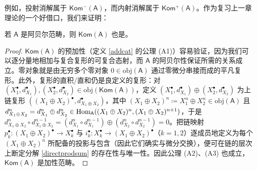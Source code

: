 
例如，投射消解属于 $\mathsf{Kom^-(A)}$，而内射消解属于 $\mathsf{Kom^+(A)}$。作为复习上一章理论的一个好借口，我们来证明：

\begin{Lem}\label{komabelian}
	若 $\mathsf{A}$ 是阿贝尔范畴，则 $\mathsf{Kom(A)}$ 也是。
\end{Lem}

\begin{proof}
	$\mathsf{Kom(A)}$ 的预加性（定义 \ref{addcat} 的公理 (A1)）容易验证，因为我们可以逐分量地相加与复合复形的可复合态射，而 $\mathsf{A}$ 的阿贝尔性保证所需的关系成立。零对象就是由无穷多个零对象 $0\in\text{obj}(\mathsf{A})$ 通过零微分串接而成的平凡复形。此外，复形的直积/直和仍是良定义的复形：对 $(X_1^\bullet, d_{X_1}^\bullet), (X_2^\bullet, d_{X_2}^\bullet)\in\text{obj}(\mathsf{Kom(A)})$，定义 $(X_1^\bullet, d_{X_1}^\bullet)\oplus(X_2^\bullet, d_{X_2}^\bullet)$ 为上链复形 $((X_1\oplus X_2)^\bullet, d_{X_1\oplus X_2}^\bullet)$，其中 $(X_1\oplus X_2)^n\coloneqq X_1^n\oplus X_2^n\in\text{obj}(\mathsf{A})$ 且 $d_{X_1\oplus X_2}^n=d_{X_1}^n\oplus d_{X_2}^n\in\text{Hom}_\mathsf{A}((X_1\oplus X_2)^n,\break(X_1\oplus X_2)^{n+1})$，于是 $d_{X_1\oplus X_2}^n\circ d_{X_1\oplus X_2}^{n-1}=(d_{X_1}^{n}\circ d_{X_1}^{n-1})\oplus(d_{X_2}^{n}\circ d_{X_2}^{n-1})=0$。把链映射 $p_k^\bullet:(X_1\oplus X_2)^\bullet\rightarrow X_k^\bullet$ 与 $i_k^\bullet:X_k^\bullet\rightarrow (X_1\oplus X_2)^\bullet$（$k=1,2$）逐成员地定义为每个 $(X_1\oplus X_2)^n$ 所配备的投影与包含（因此它们确实与微分交换），便可在链的层次上断定分解 \eqref{directprodsum} 的存在性与唯一性。因此公理 (A2)、(A3) 也成立，$\mathsf{Kom(A)}$ 是加性范畴。
	

\end{proof}
